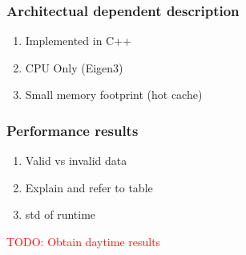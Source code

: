 \documentclass{aa}
\begin{document}
\subsubsection{Architectual dependent description}
\begin{enumerate}
\item{Implemented in C++}
\item{CPU Only (Eigen3)}
\item{Small memory footprint (hot cache)}
\end{enumerate}

\subsubsection{Performance results}
\begin{enumerate}
\item{Valid vs invalid data}
\item{Explain and refer to table}
\item{std of runtime}
\end{enumerate}
\begin{table}[tbh]

\caption{\label{tab:Performance-results} Overview of the time spent in
calibration function blocks for various datasets (daytime and nighttime). We
measured the overall time (flagging, calibrating, imaging) of a single ACM
to be 250 ms on an Intel(R) Core(TM) i7-2600 CPU @ 3.40GHz per core.}
\end{table}
\textcolor{red}{TODO: Obtain daytime results}
\end{document}
